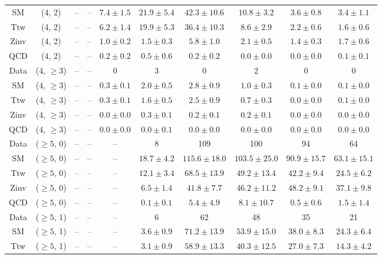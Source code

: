 \begin{table}[h!]
{\begin{tabular}{cccccccccc}
	SM & (4, 2) & -- & -- & $7.4\pm 1.5$ & $21.9\pm 5.4$ & $42.3\pm 10.6$ & $10.8\pm 3.2$ & $3.6\pm 0.8$ & $3.4\pm 1.1$ \\[0.5ex] 
	Ttw & (4, 2) & -- & -- & $6.2\pm 1.4$ & $19.9\pm 5.3$ & $36.4\pm 10.3$ & $8.6\pm 2.9$ & $2.2\pm 0.6$ & $1.6\pm 0.6$ \\[0.5ex] 
	Zinv & (4, 2) & -- & -- & $1.0\pm 0.2$ & $1.5\pm 0.3$ & $5.8\pm 1.0$ & $2.1\pm 0.5$ & $1.4\pm 0.3$ & $1.7\pm 0.6$ \\[0.5ex] 
	QCD & (4, 2) & -- & -- & $0.2\pm 0.2$ & $0.5\pm 0.6$ & $0.2\pm 0.2$ & $0.0\pm 0.0$ & $0.0\pm 0.0$ & $0.1\pm 0.1$ \\[0.5ex] 
	Data & (4, $\ge3$) & -- & -- & 0 & 3 & 0 & 2 & 0 & 0 \\[0.5ex] 
	SM & (4, $\ge3$) & -- & -- & $0.3\pm 0.1$ & $2.0\pm 0.5$ & $2.8\pm 0.9$ & $1.0\pm 0.3$ & $0.1\pm 0.0$ & $0.1\pm 0.0$ \\[0.5ex] 
	Ttw & (4, $\ge3$) & -- & -- & $0.3\pm 0.1$ & $1.6\pm 0.5$ & $2.5\pm 0.9$ & $0.7\pm 0.3$ & $0.0\pm 0.0$ & $0.1\pm 0.0$ \\[0.5ex] 
	Zinv & (4, $\ge3$) & -- & -- & $0.0\pm 0.0$ & $0.3\pm 0.1$ & $0.2\pm 0.1$ & $0.2\pm 0.1$ & $0.0\pm 0.0$ & $0.0\pm 0.0$ \\[0.5ex] 
	QCD & (4, $\ge3$) & -- & -- & $0.0\pm 0.0$ & $0.0\pm 0.1$ & $0.0\pm 0.0$ & $0.0\pm 0.0$ & $0.0\pm 0.0$ & $0.0\pm 0.0$ \\[0.5ex] 
	Data & ($\ge5$, 0) & -- & -- & -- & 8 & 109 & 100 & 94 & 64 \\[0.5ex] 
	SM & ($\ge5$, 0) & -- & -- & -- & $18.7\pm 4.2$ & $115.6\pm 18.0$ & $103.5\pm 25.0$ & $90.9\pm 15.7$ & $63.1\pm 15.1$ \\[0.5ex] 
	Ttw & ($\ge5$, 0) & -- & -- & -- & $12.1\pm 3.4$ & $68.5\pm 13.9$ & $49.2\pm 13.4$ & $42.2\pm 9.4$ & $24.5\pm 6.2$ \\[0.5ex] 
	Zinv & ($\ge5$, 0) & -- & -- & -- & $6.5\pm 1.4$ & $41.8\pm 7.7$ & $46.2\pm 11.2$ & $48.2\pm 9.1$ & $37.1\pm 9.8$ \\[0.5ex] 
	QCD & ($\ge5$, 0) & -- & -- & -- & $0.1\pm 0.1$ & $5.4\pm 4.9$ & $8.1\pm 10.7$ & $0.5\pm 0.6$ & $1.5\pm 1.4$ \\[0.5ex] 
	Data & ($\ge5$, 1) & -- & -- & -- & 6 & 62 & 48 & 35 & 21 \\[0.5ex] 
	SM & ($\ge5$, 1) & -- & -- & -- & $3.6\pm 0.9$ & $71.2\pm 13.9$ & $53.9\pm 15.0$ & $38.0\pm 8.3$ & $24.3\pm 6.4$ \\[0.5ex] 
	Ttw & ($\ge5$, 1) & -- & -- & -- & $3.1\pm 0.9$ & $58.9\pm 13.3$ & $40.3\pm 12.5$ & $27.0\pm 7.3$ & $14.3\pm 4.2$ \\[0.5ex] 

\end{tabular}}
\end{table}
